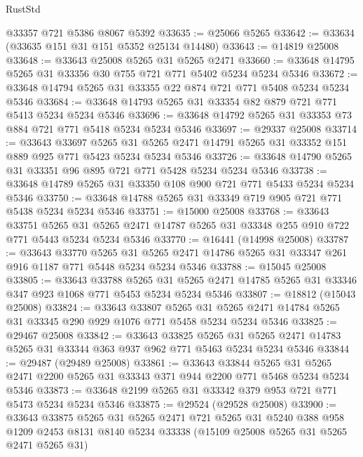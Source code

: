 \begin{lexlean}{RustStd}
\begin{coremodule}
    @33357
    @721
    @5386
    @8067
    @5392
@33635 := @25066 @5265
@33642 := @33634 (@33635 @151 @31 @151 @5352 @25134 @14480)
@33643 := @14819 @25008
@33648 := @33643 @25008 @5265 @31 @5265 @2471
@33660 := @33648 @14795 @5265 @31 @33356 @30 @755 @721 @771 @5402 @5234 @5234 @5346
@33672 := @33648 @14794 @5265 @31 @33355 @22 @874 @721 @771 @5408 @5234 @5234 @5346
@33684 := @33648 @14793 @5265 @31 @33354 @82 @879 @721 @771 @5413 @5234 @5234 @5346
@33696 := @33648 @14792 @5265 @31 @33353 @73 @884 @721 @771 @5418 @5234 @5234 @5346
@33697 := @29337 @25008
@33714 := @33643
    @33697
    @5265
    @31
    @5265
    @2471
    @14791
    @5265
    @31
    @33352
    @151
    @889
    @925
    @771
    @5423
    @5234
    @5234
    @5346
@33726 := @33648 @14790 @5265 @31 @33351 @96 @895 @721 @771 @5428 @5234 @5234 @5346
@33738 := @33648 @14789 @5265 @31 @33350 @108 @900 @721 @771 @5433 @5234 @5234 @5346
@33750 := @33648 @14788 @5265 @31 @33349 @719 @905 @721 @771 @5438 @5234 @5234 @5346
@33751 := @15000 @25008
@33768 := @33643
    @33751
    @5265
    @31
    @5265
    @2471
    @14787
    @5265
    @31
    @33348
    @255
    @910
    @722
    @771
    @5443
    @5234
    @5234
    @5346
@33770 := @16441 (@14998 @25008)
@33787 := @33643
    @33770
    @5265
    @31
    @5265
    @2471
    @14786
    @5265
    @31
    @33347
    @261
    @916
    @1187
    @771
    @5448
    @5234
    @5234
    @5346
@33788 := @15045 @25008
@33805 := @33643
    @33788
    @5265
    @31
    @5265
    @2471
    @14785
    @5265
    @31
    @33346
    @347
    @923
    @1068
    @771
    @5453
    @5234
    @5234
    @5346
@33807 := @18812 (@15043 @25008)
@33824 := @33643
    @33807
    @5265
    @31
    @5265
    @2471
    @14784
    @5265
    @31
    @33345
    @290
    @929
    @1076
    @771
    @5458
    @5234
    @5234
    @5346
@33825 := @29467 @25008
@33842 := @33643
    @33825
    @5265
    @31
    @5265
    @2471
    @14783
    @5265
    @31
    @33344
    @363
    @937
    @962
    @771
    @5463
    @5234
    @5234
    @5346
@33844 := @29487 (@29489 @25008)
@33861 := @33643
    @33844
    @5265
    @31
    @5265
    @2471
    @2200
    @5265
    @31
    @33343
    @371
    @944
    @2200
    @771
    @5468
    @5234
    @5234
    @5346
@33873 := @33648 @2199 @5265 @31 @33342 @379 @953 @721 @771 @5473 @5234 @5234 @5346
@33875 := @29524 (@29528 @25008)
@33900 := @33643
    @33875
    @5265
    @31
    @5265
    @2471
    @721
    @5265
    @31
    @5240
    @388
    @958
    @1209
    @2453
    @8131
    @8140
    @5234
    @33338
    (@15109 @25008 @5265 @31 @5265 @2471 @5265 @31)

\end{coremodule}
\end{lexlean}
